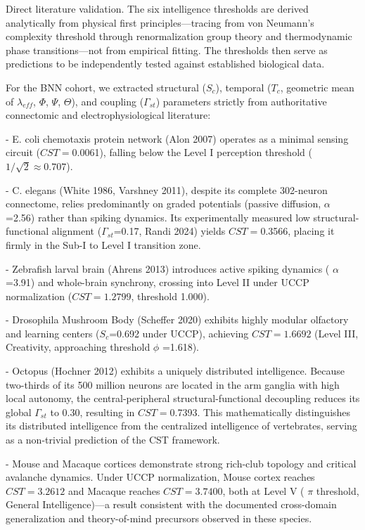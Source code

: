 \documentclass[a4paper,12pt]{article}
\begin{document}
Direct literature validation. The six intelligence thresholds are derived analytically from physical first principles---tracing from von Neumann's complexity threshold through renormalization group theory and thermodynamic phase transitions---not from empirical fitting. The thresholds then serve as predictions to be independently tested against established biological data.

For the BNN cohort, we extracted structural ($S_{c}$), temporal ($T_{c}$, geometric mean of $\lambda_{eff}$, $\Phi$, $\Psi$, $\Theta$), and coupling ($\Gamma_{st}$) parameters strictly from authoritative connectomic and electrophysiological literature:

- E. coli chemotaxis protein network (Alon 2007) operates as a minimal sensing circuit ($CST = $0.0061), falling below the Level I perception threshold ($1/\sqrt{2} \approx 0.707$).

- C. elegans (White 1986, Varshney 2011), despite its complete 302-neuron connectome, relies predominantly on graded potentials (passive diffusion,  $\alpha$ =2.56) rather than spiking dynamics. Its experimentally measured low structural-functional alignment ($\Gamma_{st}$=0.17, Randi 2024) yields $CST = $0.3566, placing it firmly in the Sub-I to Level I transition zone.

- Zebrafish larval brain (Ahrens 2013) introduces active spiking dynamics ( $\alpha$ =3.91) and whole-brain synchrony, crossing into Level II under UCCP normalization ($CST = 1.2799$, threshold 1.000).

- Drosophila Mushroom Body (Scheffer 2020) exhibits highly modular olfactory and learning centers ($S_{c}$=0.692 under UCCP), achieving $CST = 1.6692$ (Level III, Creativity, approaching threshold  $\phi$ =1.618).

- Octopus (Hochner 2012) exhibits a uniquely distributed intelligence. Because two-thirds of its 500 million neurons are located in the arm ganglia with high local autonomy, the central-peripheral structural-functional decoupling reduces its global $\Gamma_{st}$ to 0.30, resulting in $CST = $0.7393. This mathematically distinguishes its distributed intelligence from the centralized intelligence of vertebrates, serving as a non-trivial prediction of the CST framework.

- Mouse and Macaque cortices demonstrate strong rich-club topology and critical avalanche dynamics. Under UCCP normalization, Mouse cortex reaches $CST = 3.2612$ and Macaque reaches $CST = 3.7400$, both at Level V ( $\pi$  threshold, General Intelligence)---a result consistent with the documented cross-domain generalization and theory-of-mind precursors observed in these species.
\end{document}
